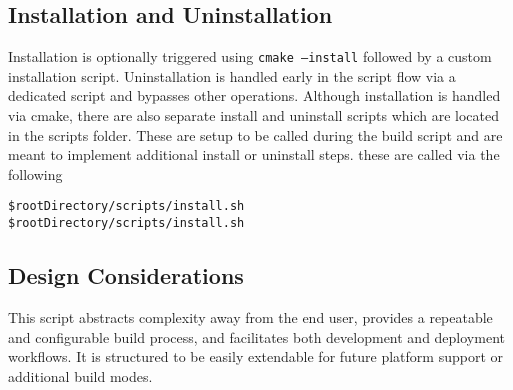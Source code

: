 \subsection{Installation and Uninstallation}

Installation is optionally triggered using \texttt{cmake --install} followed by a custom installation script. Uninstallation is handled early in the script flow via a dedicated script and bypasses other operations. Although installation is handled via cmake, there are also separate install and uninstall scripts which are located in the scripts folder. These are setup to be called during the build script and are meant to implement additional install or uninstall steps. these are called via the following

\begin{lstlisting}[style=shellstyle]
$rootDirectory/scripts/install.sh
$rootDirectory/scripts/install.sh
\end{lstlisting}

\subsection{Design Considerations}

This script abstracts complexity away from the end user, provides a repeatable and configurable build process, and facilitates both development and deployment workflows. It is structured to be easily extendable for future platform support or additional build modes.










